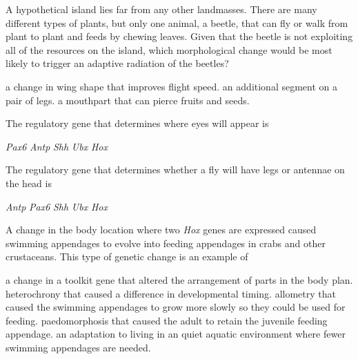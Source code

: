 \question
A hypothetical island lies far from any other landmasses. There are many different types of plants, but only one animal, a beetle, that can fly or walk from plant to plant and feeds by chewing leaves. Given that the beetle is not exploiting all of the resources on the island, which morphological change would be most likely to trigger an adaptive radiation of the beetles?

\begin{choices}
\choice a change in wing shape that improves flight speed. %
\choice an additional segment on a pair of legs. %
\correctchoice a mouthpart that can pierce fruits and seeds. %
\end{choices}


\question
The regulatory gene that determines where eyes will appear is

\begin{choices}
\correctchoice \textit{Pax6} %
\choice \textit{Antp} %
\choice \textit{Shh} %
\choice \textit{Ubx} %
\choice \textit{Hox} %
\end{choices}

\question
The regulatory gene that determines whether a fly will have legs or antennae on the head is

\begin{choices}
\correctchoice \textit{Antp} %
\choice \textit{Pax6} %
\choice \textit{Shh} %
\choice \textit{Ubx} %
\choice \textit{Hox} %
\end{choices}


\question
A change in the body location where two \textit{Hox} genes are expressed caused swimming appendages to evolve into feeding appendages in crabs and other crustaceans. This type of genetic change is an example of

\begin{choices}
\correctchoice a change in a toolkit gene that altered the arrangement of parts in the body plan. %
\choice heterochrony that caused a difference in developmental timing. %
\choice allometry that caused the swimming appendages to grow more slowly so they could be used for feeding. %
\choice paedomorphosis that caused the adult to retain the juvenile feeding appendage. %
\choice an adaptation to living in an quiet aquatic environment where fewer swimming appendages are needed. %
\end{choices}



